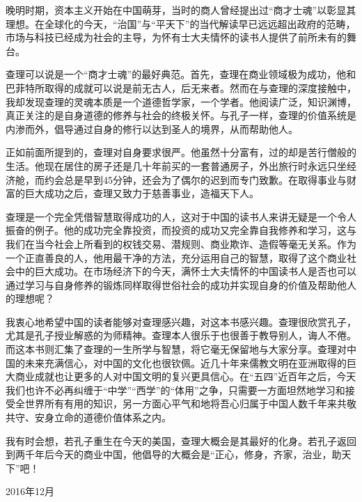 晚明时期，资本主义开始在中国萌芽，当时的商人曾经提出过“商才士魂”以彰显其理想。在全球化的今天，“治国”与“平天下”的当代解读早已远远超出政府的范畴，市场与科技已经成为社会的主导，为怀有士大夫情怀的读书人提供了前所未有的舞台。
\par

查理可以说是一个“商才士魂”的最好典范。首先，查理在商业领域极为成功，他和巴菲特所取得的成就可以说是前无古人，后无来者。然而在与查理的深度接触中，我却发现查理的灵魂本质是一个道德哲学家，一个学者。他阅读广泛，知识渊博，真正关注的是自身道德的修养与社会的终极关怀。与孔子一样，查理的价值系统是内渗而外，倡导通过自身的修行以达到圣人的境界，从而帮助他人。
\par

正如前面所提到的，查理对自身要求很严。他虽然十分富有，过的却是苦行僧般的生活。他现在居住的房子还是几十年前买的一套普通房子，外出旅行时永远只坐经济舱，而约会总是早到45分钟，还会为了偶尔的迟到而专门致歉。在取得事业与财富的巨大成功之后，查理又致力于慈善事业，造福天下人。
\par

查理是一个完全凭借智慧取得成功的人，这对于中国的读书人来讲无疑是一个令人振奋的例子。他的成功完全靠投资，而投资的成功又完全靠自我修养和学习，这与我们在当今社会上所看到的权钱交易、潜规则、商业欺诈、造假等毫无关系。作为一个正直善良的人，他用最干净的方法，充分运用自己的智慧，取得了这个商业社会中的巨大成功。在市场经济下的今天，满怀士大夫情怀的中国读书人是否也可以通过学习与自身修养的锻炼同样取得世俗社会的成功并实现自身的价值及帮助他人的理想呢？
\par

我衷心地希望中国的读者能够对查理感兴趣，对这本书感兴趣。查理很欣赏孔子，尤其是孔子授业解惑的为师精神。查理本人很乐于也很善于教导别人，诲人不倦。而这本书则汇集了查理的一生所学与智慧，将它毫无保留地与大家分享。查理对中国的未来充满信心，对中国的文化也很钦佩。近几十年来儒教文明在亚洲取得的巨大商业成就也让更多的人对中国文明的复兴更具信心。在“五四”近百年之后，今天我们也许不必再纠缠于“中学”“西学”的“体用”之争，只需要一方面坦然地学习和接受全世界所有有用的知识，另一方面心平气和地将吾心归属于中国人数千年来共敬共守、安身立命的道德价值体系之内。
\par

我有时会想，若孔子重生在今天的美国，查理大概会是其最好的化身。若孔子返回到两千年后今天的商业中国，他倡导的大概会是“正心，修身，齐家，治业，助天下”吧！
\par

{\kaishu\raggedleft 2016年12月\par}
